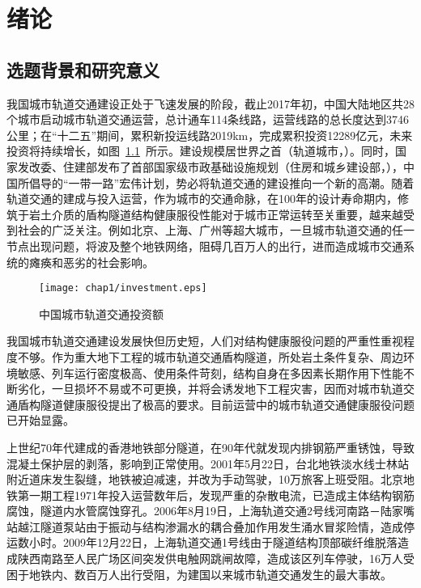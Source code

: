 \chapter{绪论}

\section{选题背景和研究意义}

我国城市轨道交通建设正处于飞速发展的阶段，截止2017年初，中国大陆地区共28个城市启动城市轨道交通运营，总计通车114条线路，运营线路的总长度达到3746公里；在“十二五”期间，累积新投运线路2019km，完成累积投资12289亿元，未来投资将持续增长，如图~\ref{fig:城市轨道交通投资额}~所示。建设规模居世界之首（轨道城市，\citeyear{轨道2017}）。同时，国家发改委、住建部发布了首部国家级市政基础设施规划（住房和城乡建设部，\citeyear{住房和城乡建设部}），中国所倡导的“一带一路”宏伟计划，势必将轨道交通的建设推向一个新的高潮。随着轨道交通的建成与投入运营，作为城市的交通命脉，在100年的设计寿命期内，修筑于岩土介质的盾构隧道结构健康服役性能对于城市正常运转至关重要，越来越受到社会的广泛关注。例如北京、上海、广州等超大城市，一旦城市轨道交通的任一节点出现问题，将波及整个地铁网络，阻碍几百万人的出行，进而造成城市交通系统的瘫痪和恶劣的社会影响。

\begin{figure}[!h]
	\centering
	\texttt{[image: chap1/investment.eps]}
	\caption{中国城市轨道交通投资额}
	\label{fig:城市轨道交通投资额}
\end{figure}

我国城市轨道交通建设发展快但历史短，人们对结构健康服役问题的严重性重视程度不够。作为重大地下工程的城市轨道交通盾构隧道，所处岩土条件复杂、周边环境敏感、列车运行密度极高、使用条件苛刻，结构自身在多因素长期作用下性能不断劣化，一旦损坏不易或不可更换，并将会诱发地下工程灾害，因而对城市轨道交通盾构隧道健康服役提出了极高的要求。目前运营中的城市轨道交通健康服役问题已开始显露。

上世纪70年代建成的香港地铁部分隧道，在90年代就发现内排钢筋严重锈蚀，导致混凝土保护层的剥落，影响到正常使用。2001年5月22日，台北地铁淡水线士林站附近道床发生裂缝，地铁被迫减速，并改为手动驾驶，10万旅客上班受阻。北京地铁第一期工程1971年投入运营数年后，发现严重的杂散电流，已造成主体结构钢筋腐蚀，隧道内水管腐蚀穿孔。2006年8月19日，上海轨道交通2号线河南路－陆家嘴站越江隧道泵站由于振动与结构渗漏水的耦合叠加作用发生涌水冒浆险情，造成停运数小时。2009年12月22日，上海轨道交通1号线由于隧道结构顶部碳纤维脱落造成陕西南路至人民广场区间突发供电触网跳闸故障，造成该区列车停驶，16万人受困于地铁内、数百万人出行受阻，为建国以来城市轨道交通发生的最大事故。 


